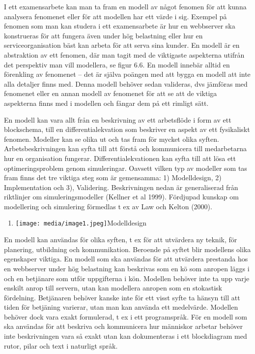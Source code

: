 I ett examensarbete kan man ta fram en modell av något fenomen för att
kunna analysera fenomenet eller för att modellen har ett värde i sig.
Exempel på fenomen som man kan studera i ett examensarbete är hur en
webbserver ska konstrueras för att fungera även under hög belastning
eller hur en serviceorganisation bäst kan arbeta för att serva sina
kunder. En modell är en abstraktion av ett fenomen, där man tagit med de
viktigaste aspekterna utifrån det perspektiv man vill modellera, se
figur 6.6. En modell innebär alltid en förenkling av fenomenet -- det är
själva poängen med att bygga en modell att inte alla detaljer finns med.
Denna modell behöver sedan valideras, dvs jämföras med fenomenet eller
en annan modell av fenomenet för att se att de viktiga aspekterna finns
med i modellen och fångar dem på ett rimligt sätt.

En modell kan vara allt från en beskrivning av ett arbetsflöde i form av
ett blockschema, till en differentialekvation som beskriver en aspekt av
ett fysikaliskt fenomen. Modeller kan se olika ut och tas fram för
mycket olika syften. Arbetsbeskrivningen kan syfta till att förstå och
kommunicera till medarbetarna hur en organisation fungerar.
Differentialekvationen kan syfta till att lösa ett optimeringsproblem
genom simuleringar. Oavsett vilken typ av modeller som tas fram finns
det tre viktiga steg som är gemensamma: 1) Modelldesign, 2)
Implementation och 3), Validering. Beskrivningen nedan är generaliserad
från riktlinjer om simuleringsmodeller (Kellner et al 1999). Fördjupad
kunskap om modellering och simulering förmedlas t ex av Law och Kelton
(2000).

\begin{enumerate}
\def\labelenumi{\arabic{enumi}.}
\item
  \texttt{[image: media/image1.jpeg]}Modelldesign
\end{enumerate}

En modell kan användas för olika syften, t ex för att utvärdera ny
teknik, för planering, utbildning och kommunikation. Beroende på syftet
blir modellens olika egenskaper viktiga. En modell som ska användas för
att utvärdera prestanda hos en webbserver under hög belastning kan
beskrivas som en kö som anropen läggs i och en betjänare som utför
uppgifterna i kön. Modellen behöver inte ta upp varje enskilt anrop till
servern, utan kan modellera anropen som en stokastisk fördelning.
Betjänaren behöver kanske inte för ett visst syfte ta hänsyn till att
tiden för betjäning varierar, utan man kan använda ett medelvärde.
Modellen behöver dock vara exakt formulerad, t ex i ett programspråk.
För en modell som ska användas för att beskriva och kommunicera hur
människor arbetar behöver inte beskrivningen vara så exakt utan kan
dokumenteras i ett blockdiagram med rutor, pilar och text i naturligt
språk.


